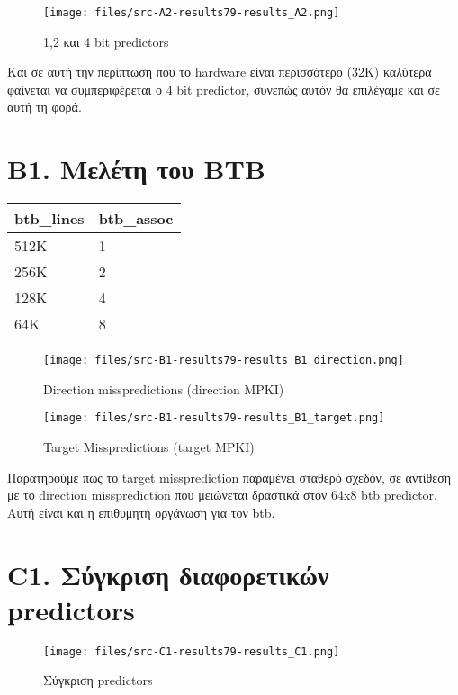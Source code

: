 \documentclass[a4paper,12pt]{article}
\begin{document}
\begin{figure}[H]
	\centering
	\texttt{[image: files/src-A2-results79-results\_A2.png]}
	\caption{1,2 και 4 bit predictors}
	\label{fig:A2}
\end{figure}

Και σε αυτή την περίπτωση που το hardware είναι περισσότερο (32K) καλύτερα
φαίνεται να συμπεριφέρεται ο 4 bit predictor, συνεπώς αυτόν θα επιλέγαμε και
σε αυτή τη φορά.



\section*{B1. Μελέτη του BTB}

\begin{tabular}{l l}
	btb\_lines & btb\_assoc \\
	\hline
	\hline
	512K & 1 \\
	256K & 2 \\
	128K & 4 \\
	64K  & 8 \\

\end{tabular}

\begin{figure}[H]
	\centering
	\texttt{[image: files/src-B1-results79-results\_B1\_direction.png]}
	\caption{Direction misspredictions (direction MPKI)}
	\label{fig:B1a}
\end{figure}

\begin{figure}[H]
	\centering
	\texttt{[image: files/src-B1-results79-results\_B1\_target.png]}
	\caption{Target Misspredictions (target MPKI)}
	\label{fig:B1b}
\end{figure}


Παρατηρούμε πως το target missprediction παραμένει σταθερό σχεδόν, σε αντίθεση
με το direction missprediction που μειώνεται δραστικά στον 64x8 btb predictor.
Αυτή είναι και η επιθυμητή οργάνωση για τον btb.

%

\section*{C1. Σύγκριση διαφορετικών predictors}
\begin{figure}[H]
	\centering
	\texttt{[image: files/src-C1-results79-results\_C1.png]}
	\caption{Σύγκριση predictors}
	\label{fig:C1}
\end{figure}
\end{document}
